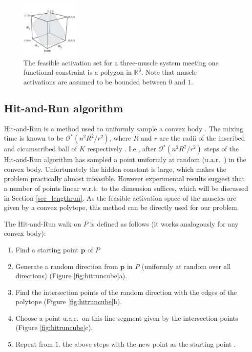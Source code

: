 \begin{figure}[ht]
  \label{fig:fig_hr}
   \begin{center}
    \includegraphics[width=0.25\textwidth]{sections/figs/feasibleactivation.png}
  \end{center}
  \caption{The feasible activation set for a  three-muscle system meeting one functional constraint is a polygon in $\mathbb{R}^3$. Note that muscle activations are assumed to be bounded between $0$ and $1$.}

\end{figure}

\subsection{Hit-and-Run algorithm}
Hit-and-Run is a method used to uniformly sample a convex body \cite{smith1984efficient}. The mixing time is known to be $\mathcal{O}^*(n^2R^2/r^2)$, where $R$ and $r$ are the radii of the inscribed and cicumscribed ball of $K$ respectively \cite{Dyer, Lovasz}. I.e., after $\mathcal{O}^*(n^2R^2/r^2)$ steps of the Hit-and-Run algorithm has sampled a point uniformly at random (u.a.r.\ ) in the convex body. Unfortunately the hidden constant is large, which makes the problem practically almost infeasible. However experimental results suggest that a number of points linear w.r.t.\ to the dimension suffices, which will be discussed in Section \ref{sec_lengthrun}. 
As the feasible activation space of the muscles are given by a convex polytope, this method can be directly used for our problem.

The Hit-and-Run walk on $P$ is defined as follows (it works analogously for any convex body):
\begin{enumerate}
\item Find a starting point $\textbf{p}$ of $P$ %
\item Generate a random direction from $\textbf{p}$ in $P$ (uniformly at random over all directions) (Figure \ref{fig:hitruncube}a).
\item Find the intersection points of the random direction with the edges of the polytope (Figure \ref{fig:hitruncube}b).
\item Choose a point u.a.r.\ on this line segment given by the intersection points (Figure \ref{fig:hitruncube}c). 
\item Repeat from $1.$ the above steps with the new point as the starting point .
\end{enumerate}


